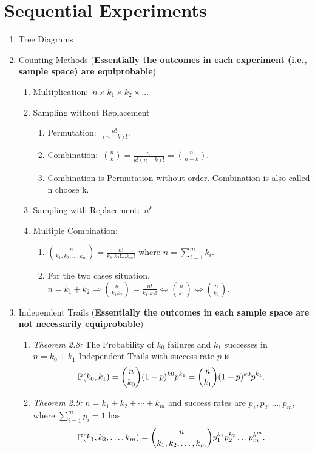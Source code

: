 \chapter{Sequential Experiments}
\begin{enumerate}
    \item Tree Diagrams
    \item Counting Methods (\textbf{Essentially the outcomes in each experiment (i.e., sample space) are equiprobable})
    \begin{enumerate}
        \item Multiplication:~$n\times k_1\times k_2\times \ldots$
        \item Sampling without Replacement
        \begin{enumerate}
            \item Permutation:~$\frac{n!}{(n-k)!}$.
            \item Combination:~$\binom{n}{k}=\frac{n!}{k!(n-k)!}=\binom{n}{n-k}$.
            \item Combination is Permutation without order. Combination is also called n choose k.
        \end{enumerate}
        \item Sampling with Replacement:~$n^k$
        \item Multiple Combination:{
            \begin{enumerate}
                \item $\binom{n}{k_1,k_2,\ldots,k_m}=\frac{n!}{k_1!k_2!\ldots k_m!}$ where $n=\sum_{i=1}^{m}k_i$.
                \item For the two cases situation, $n=k_1+k_2\Rightarrow \binom{n}{k_1k_2}=\frac{n!}{k_1!k_2!}\iff\binom{n}{k_1}\iff\binom{n}{k_2}$.
            \end{enumerate}
            }
    \end{enumerate}
    \item Independent Trails (\textbf{Essentially the outcomes in each sample space are not necessarily equiprobable})
    \begin{enumerate}
        \item \textit{Theorem 2.8:} The Probability of $k_0$ failures and $k_1$ successes in $n=k_0+k_1$ Independent Trails with success rate $p$ is \[\P{k_0, k_1}=\binom{n}{k_0}(1-p)^{k0}p^{k_1}=\binom{n}{k_1}(1-p)^{k0}p^{k_1}.\]
        \item \textit{Theorem 2.9:} $n=k_1+k_2+\cdots+k_m$ and success rates are $p_1, p_2,\ldots,p_m$, where $\sum_{i=1}^{m}p_i=1$ has
        \[\P{k_1,k_2,\ldots,k_m}=\binom{n}{k_1,k_2,\ldots,k_m}p_1^{k_1}p_2^{k_2}\ldots p_m^{k^m}.\]
    \end{enumerate}
\end{enumerate}